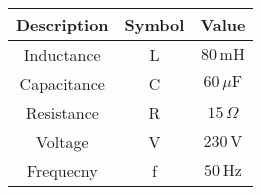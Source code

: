 \begin{tabular}{c|c|c}
	\hline
	Description & Symbol & Value\\
	\hline
	Inductance & L &  $80\, \text{mH}$\\
	Capacitance & C &  $60\, \mu\text{F}$\\
	Resistance & R &  $15\, \Omega$\\
	Voltage & V & $230\, \text{V}$\\
	Frequecny & f & $50\, \text{Hz}$\\
	\hline
\end{tabular}